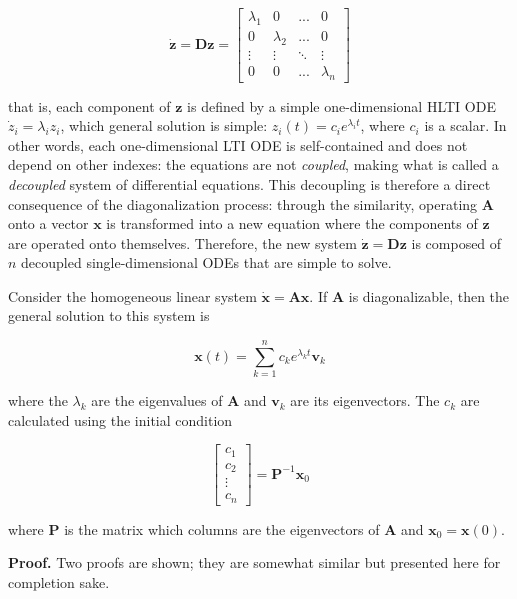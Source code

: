 \begin{equation} \dot{\mathbf{z}} = \mathbf{Dz} = \left[\begin{array}{cccc} \lambda_1 & 0 & ... & 0 \\[3mm] 0 & \lambda_2 & ... & 0 \\[3mm] \vdots & \vdots & \ddots & \vdots \\[3mm] 0 & 0 & ... & \lambda_n \end{array}\right] \end{equation}

	\noindent that is, each component of $\mathbf{z}$ is defined by a simple one-dimensional HLTI ODE $\dot{z}_i = \lambda_i z_i$, which general solution is simple: $z_i(t) = c_ie^{\lambda_i t}$, where $c_i$ is a scalar. In other words, each one-dimensional LTI ODE is self-contained and does not depend on other indexes: the equations are not \textit{coupled}, making what is called a \textit{decoupled} system of differential equations. This decoupling is therefore a direct consequence of the diagonalization process: through the similarity, operating $\mathbf{A}$ onto a vector $\mathbf{x}$ is transformed into a new equation where the components of $\mathbf{z}$ are operated onto themselves. Therefore, the new system $\dot{\mathbf{z}} = \mathbf{Dz}$ is composed of $n$ decoupled single-dimensional ODEs that are simple to solve.

\begin{theorem}\label{theo:diagonalizable_lti_sol} %
	Consider the homogeneous linear system $\dot{\mathbf{x}} = \mathbf{Ax}$. If $\mathbf{A}$ is diagonalizable, then the general solution to this system is

\begin{equation} \mathbf{x}(t) = \sum\limits_{k=1}^n c_ke^{\lambda_k t} \mathbf{v}_k \end{equation}

	\noindent where the $\lambda_k$ are the eigenvalues of $\mathbf{A}$ and $\mathbf{v}_k$ are its eigenvectors. The $c_k$ are calculated using the initial condition

\begin{equation} \left[\begin{array}{c} c_1 \\[3mm] c_2 \\[3mm] \vdots \\[3mm] c_n \end{array}\right] = \mathbf{P}^{-1}\mathbf{x}_0 \end{equation}

	\noindent where $\mathbf{P}$ is the matrix which columns are the eigenvectors of $\mathbf{A}$ and $\mathbf{x}_0 = \mathbf{x}\left(0\right)$.

\end{theorem}
\textbf{Proof.} Two proofs are shown; they are somewhat similar but presented here for completion sake.

